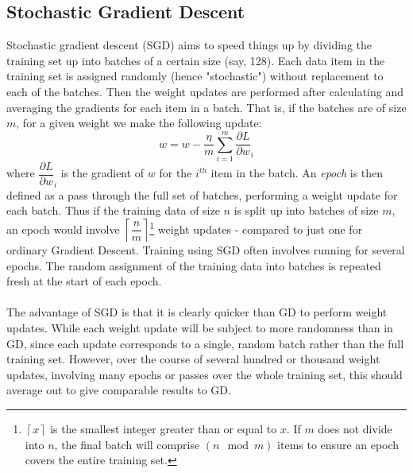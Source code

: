 \documentclass[11pt]{article} %
\theoremstyle{plain}
\theoremstyle{definition}
\begin{document}
\subsection{Stochastic Gradient Descent}
Stochastic gradient descent (SGD) aims to speed things up by dividing the training set up into batches of a certain size (say, 128). Each data item in the training set is assigned randomly (hence "stochastic") without replacement to each of the batches. Then the weight updates are performed after calculating and averaging the gradients for each item in a batch. That is, if the batches are of size \(m\), for a given weight we make the following update:
\[ w = w - \dfrac{\eta}{m}\sum_{i=1}^{m} {\dfrac{\partial L}{\partial w}}_i \]
where \({\dfrac{\partial L}{\partial w}}_i\) is the gradient of \(w\) for the \(i^{th}\) item in the batch. An \textit{epoch} is then defined as a pass through the full set of batches, performing a weight update for each batch. Thus if the training data of size \(n\) is split up into batches of size \(m\), an epoch would involve \( \left \lceil{\dfrac{n}{m}}\right \rceil \)\footnote{\( \left \lceil{x}\right \rceil \) is the smallest integer greater than or equal to \(x\). If \(m\) does not divide into \(n\), the final batch will comprise \((n \mod m)\) items to ensure an epoch covers the entire training set.} weight updates - compared to just one for ordinary Gradient Descent. Training using SGD often involves running for several epochs. The random assignment of the training data into batches is repeated fresh at the start of each epoch.
\\
\\
\noindent
The advantage of SGD is that it is clearly quicker than GD to perform weight updates. While each weight update will be subject to more randomness than in GD, since each update corresponds to a single, random batch rather than the full training set. However, over the course of several hundred or thousand weight updates, involving many epochs or passes over the whole training set, this should average out to give comparable results to GD. 
\end{document}
